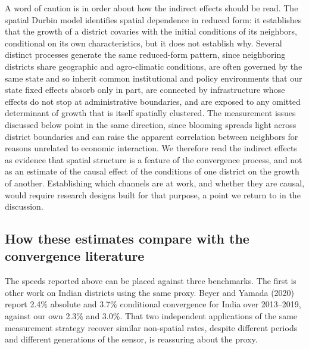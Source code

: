 \documentclass[
  letterpaper,
  DIV=11,
  numbers=noendperiod]{scrartcl}
\begin{document}
A word of caution is in order about how the indirect effects should be
read. The spatial Durbin model identifies spatial dependence in reduced
form: it establishes that the growth of a district covaries with the
initial conditions of its neighbors, conditional on its own
characteristics, but it does not establish why. Several distinct
processes generate the same reduced-form pattern, since neighboring
districts share geographic and agro-climatic conditions, are often
governed by the same state and so inherit common institutional and
policy environments that our state fixed effects absorb only in part,
are connected by infrastructure whose effects do not stop at
administrative boundaries, and are exposed to any omitted determinant of
growth that is itself spatially clustered. The measurement issues
discussed below point in the same direction, since blooming spreads
light across district boundaries and can raise the apparent correlation
between neighbors for reasons unrelated to economic interaction. We
therefore read the indirect effects as evidence that spatial structure
is a feature of the convergence process, and not as an estimate of the
causal effect of the conditions of one district on the growth of
another. Establishing which channels are at work, and whether they are
causal, would require research designs built for that purpose, a point
we return to in the discussion.

\subsection{How these estimates compare with the convergence
literature}\label{how-these-estimates-compare-with-the-convergence-literature}

The speeds reported above can be placed against three benchmarks. The
first is other work on Indian districts using the same proxy. Beyer and
Yamada (2020) report 2.4\% absolute and 3.7\% conditional convergence
for India over 2013--2019, against our own 2.3\% and 3.0\%. That two
independent applications of the same measurement strategy recover
similar non-spatial rates, despite different periods and different
generations of the sensor, is reassuring about the proxy.
\end{document}
